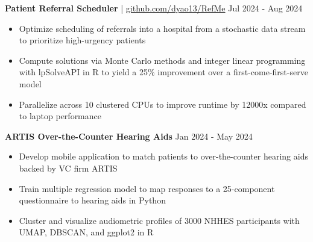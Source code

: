 \documentclass[11pt]{article}       %
\begin{document}
\textbf{Patient Referral Scheduler} | \href{https://github.com/dyao13/RefMe}{github.com/dyao13/RefMe} \hfill Jul 2024 - Aug 2024 \vspace{-9pt} \\
\begin{itemize}
  \item Optimize scheduling of referrals into a hospital from a stochastic data stream to prioritize high-urgency patients 
  \item Compute solutions via Monte Carlo methods and integer linear programming with lpSolveAPI in R to yield a 25\% improvement over a first-come-first-serve model
  \item Parallelize across 10 clustered CPUs to improve runtime by 12000x compared to laptop performance
\end{itemize}

\textbf{ARTIS Over-the-Counter Hearing Aids} \hfill Jan 2024 - May 2024 \vspace{-9pt} \\
\begin{itemize}
  \item Develop mobile application to match patients to over-the-counter hearing aids backed by VC firm ARTIS
  \item Train multiple regression model to map responses to a 25-component questionnaire to hearing aids in Python
  \item Cluster and visualize audiometric profiles of 3000 NHHES participants with UMAP, DBSCAN, and ggplot2 in R
\end{itemize}

\vspace{-9pt}
\end{document}
